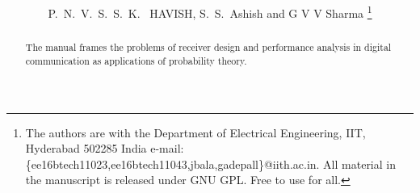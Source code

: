 \documentclass[journal,12pt,twocolumn]{IEEEtran}
\begin{document}
\title{
}
%
%
%

\author{P.~N.~V.~S.~S.~K.~ HAVISH, S.~S.~Ashish and G V V Sharma %
\thanks{The authors are with the Department
of Electrical Engineering, IIT, Hyderabad
502285 India e-mail: \{ee16btech11023,ee16btech11043,jbala,gadepall\}@iith.ac.in. All material in the manuscript is released under GNU GPL.  Free to use for all.
}}



\maketitle

\tableofcontents

\bigskip

\begin{abstract}
The manual frames the problems of receiver design and performance analysis in digital communication as applications of probability theory.

\end{abstract}




%
\IEEEpeerreviewmaketitle
\end{document}
